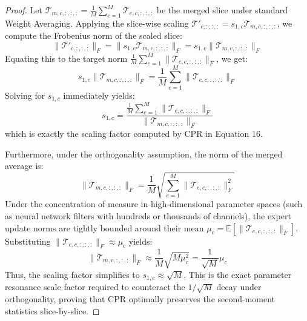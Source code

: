 \documentclass{article}
\theoremstyle{plain}
\theoremstyle{definition}
\theoremstyle{remark}
\begin{document}
\begin{proof}
Let $\mathcal{T}_{m, c, :, :, :} = \frac{1}{M} \sum_{e=1}^M \mathcal{T}_{e, c, :, :, :}$ be the merged slice under standard Weight Averaging. Applying the slice-wise scaling $\mathcal{T}'_{c, :, :, :} = s_{1, c} \mathcal{T}_{m, c, :, :, :}$, we compute the Frobenius norm of the scaled slice:
\begin{equation}
    \|\mathcal{T}'_{c, :, :, :}\|_F = \|s_{1, c} \mathcal{T}_{m, c, :, :, :}\|_F = s_{1, c} \|\mathcal{T}_{m, c, :, :, :}\|_F
\end{equation}
Equating this to the target norm $\frac{1}{M} \sum_{e=1}^M \|\mathcal{T}_{e, c, :, :, :}\|_F$, we get:
\begin{equation}
    s_{1, c} \|\mathcal{T}_{m, c, :, :, :}\|_F = \frac{1}{M} \sum_{e=1}^M \|\mathcal{T}_{e, c, :, :, :}\|_F
\end{equation}
Solving for $s_{1, c}$ immediately yields:
\begin{equation}
    s_{1, c} = \frac{\frac{1}{M} \sum_{e=1}^M \|\mathcal{T}_{e, c, :, :, :}\|_F}{\|\mathcal{T}_{m, c, :, :, :}\|_F}
\end{equation}
which is exactly the scaling factor computed by CPR in Equation 16.

Furthermore, under the orthogonality assumption, the norm of the merged average is:
\begin{equation}
    \|\mathcal{T}_{m, c, :, :, :}\|_F = \frac{1}{M} \sqrt{\sum_{e=1}^M \|\mathcal{T}_{e, c, :, :, :}\|_F^2}
\end{equation}
Under the concentration of measure in high-dimensional parameter spaces (such as neural network filters with hundreds or thousands of channels), the expert update norms are tightly bounded around their mean $\mu_c = \mathbb{E}[\|\mathcal{T}_{e, c, :, :, :}\|_F]$. Substituting $\|\mathcal{T}_{e, c, :, :, :}\|_F \approx \mu_c$ yields:
\begin{equation}
    \|\mathcal{T}_{m, c, :, :, :}\|_F \approx \frac{1}{M} \sqrt{M \mu_c^2} = \frac{1}{\sqrt{M}} \mu_c
\end{equation}
Thus, the scaling factor simplifies to $s_{1, c} \approx \sqrt{M}$. This is the exact parameter resonance scale factor required to counteract the $1/\sqrt{M}$ decay under orthogonality, proving that CPR optimally preserves the second-moment statistics slice-by-slice.
\end{proof}
\end{document}
